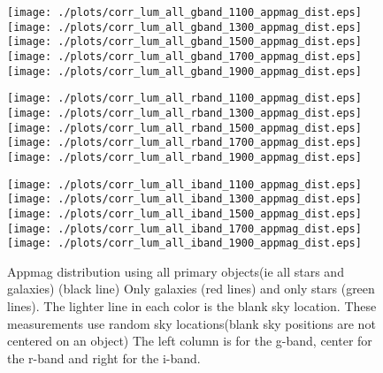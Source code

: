 \documentclass[10pt]{article}
\begin{document}
\begin{figure}
\centering
\begin{minipage}{0.32\textwidth}
 \texttt{[image: ./plots/corr\_lum\_all\_gband\_1100\_appmag\_dist.eps]}
 \texttt{[image: ./plots/corr\_lum\_all\_gband\_1300\_appmag\_dist.eps]}
 \texttt{[image: ./plots/corr\_lum\_all\_gband\_1500\_appmag\_dist.eps]}
 \texttt{[image: ./plots/corr\_lum\_all\_gband\_1700\_appmag\_dist.eps]}
 \texttt{[image: ./plots/corr\_lum\_all\_gband\_1900\_appmag\_dist.eps]}
\end{minipage}
\begin{minipage}{0.32\textwidth}
 \texttt{[image: ./plots/corr\_lum\_all\_rband\_1100\_appmag\_dist.eps]}
 \texttt{[image: ./plots/corr\_lum\_all\_rband\_1300\_appmag\_dist.eps]}
 \texttt{[image: ./plots/corr\_lum\_all\_rband\_1500\_appmag\_dist.eps]}
 \texttt{[image: ./plots/corr\_lum\_all\_rband\_1700\_appmag\_dist.eps]}
 \texttt{[image: ./plots/corr\_lum\_all\_rband\_1900\_appmag\_dist.eps]}
\end{minipage}
\begin{minipage}{0.32\textwidth}
 \texttt{[image: ./plots/corr\_lum\_all\_iband\_1100\_appmag\_dist.eps]}
 \texttt{[image: ./plots/corr\_lum\_all\_iband\_1300\_appmag\_dist.eps]}
 \texttt{[image: ./plots/corr\_lum\_all\_iband\_1500\_appmag\_dist.eps]}
 \texttt{[image: ./plots/corr\_lum\_all\_iband\_1700\_appmag\_dist.eps]}
 \texttt{[image: ./plots/corr\_lum\_all\_iband\_1900\_appmag\_dist.eps]}
\end{minipage}
\caption{Appmag distribution using all primary objects(ie all stars and galaxies) (black line) 
Only galaxies (red lines) and only stars (green lines).
The lighter line in each color is the blank sky location.
These measurements use random sky locations(blank sky positions are not centered on an object)
The left column is for the g-band, center for the r-band and right for the i-band.
}
\end{figure}
\end{document}
